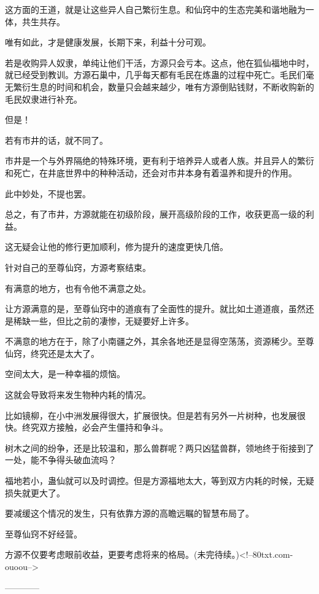 \begin{this_body}
这方面的王道，就是让这些异人自己繁衍生息。和仙窍中的生态完美和谐地融为一体，共生共存。

唯有如此，才是健康发展，长期下来，利益十分可观。

若是收购异人奴隶，单纯让他们干活，方源只会亏本。这点，他在狐仙福地中时，就已经受到教训。方源石巢中，几乎每天都有毛民在炼蛊的过程中死亡。毛民们毫无繁衍生息的时间和机会，数量只会越来越少，唯有方源倒贴钱财，不断收购新的毛民奴隶进行补充。

但是！

若有市井的话，就不同了。

市井是一个与外界隔绝的特殊环境，更有利于培养异人或者人族。并且异人的繁衍和死亡，在井底世界中的种种活动，还会对市井本身有着温养和提升的作用。

此中妙处，不提也罢。

总之，有了市井，方源就能在初级阶段，展开高级阶段的工作，收获更高一级的利益。

这无疑会让他的修行更加顺利，修为提升的速度更快几倍。

针对自己的至尊仙窍，方源考察结束。

有满意的地方，也有令他不满意之处。

让方源满意的是，至尊仙窍中的道痕有了全面性的提升。就比如土道道痕，虽然还是稀缺一些，但比之前的凄惨，无疑要好上许多。

不满意的地方在于，除了小南疆之外，其余各地还是显得空荡荡，资源稀少。至尊仙窍，终究还是太大了。

空间太大，是一种幸福的烦恼。

这就会导致将来发生物种内耗的情况。

比如镜柳，在小中洲发展得很大，扩展很快。但是若有另外一片树种，也发展很快。终究双方接触，必会产生僵持和争斗。

树木之间的纷争，还是比较温和，那么兽群呢？两只凶猛兽群，领地终于衔接到了一处，能不争得头破血流吗？

福地若小，蛊仙就可以及时调控。但是方源福地太大，等到双方内耗的时候，无疑损失就更大了。

要减缓这个情况的发生，只有依靠方源的高瞻远瞩的智慧布局了。

至尊仙窍不好经营。

方源不仅要考虑眼前收益，更要考虑将来的格局。(未完待续。)<!--80txt.com-ouoou-->

------------

\end{this_body}

